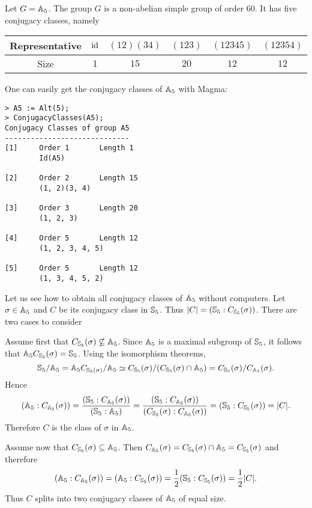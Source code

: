 Let $G=\mathbb{A}_5$. 
The group $G$ is a non-abelian simple group of order 60. It has five conjugacy classes, namely

\bigskip 
\begin{center}
    \begin{tabular}{c|ccccc}
         Representative & $\operatorname{id}$  & $(12)(34)$ & $(123)$  & $(12345)$ & $(12354)$\\
         \hline 
         Size & $1$ & $15$ & $20$ & $12$ & $12$ \\
    \end{tabular}
\end{center}
\bigskip 

One can easily get the conjugacy classes of 
$\mathbb{A}_5$ with Magma:
\begin{lstlisting}
> A5 := Alt(5);
> ConjugacyClasses(A5);
Conjugacy Classes of group A5
-----------------------------
[1]     Order 1       Length 1
        Id(A5)

[2]     Order 2       Length 15
        (1, 2)(3, 4)

[3]     Order 3       Length 20
        (1, 2, 3)

[4]     Order 5       Length 12
        (1, 2, 3, 4, 5)

[5]     Order 5       Length 12
        (1, 3, 4, 5, 2)    
\end{lstlisting}

Let us see how to obtain all conjugacy classes
of $\mathbb{A}_5$ without computers. Let $\sigma\in\mathbb{A}_5$ and $C$ be its
conjugacy class in $\mathbb{S}_5$. Thus $|C|=(\mathbb{S}_5:C_{\mathbb{S}_5}(\sigma))$. There are two cases to consider

Assume first that $C_{\mathbb{S}_5}(\sigma)\not\subseteq\mathbb{A}_5$. Since $\mathbb{A}_5$ is a maximal subgroup of $\mathbb{S}_5$, it follows that 
$\mathbb{A}_5C_{\mathbb{S}_5}(\sigma)=\mathbb{S}_5$. Using the isomorphism theorems, 
\[
\mathbb{S}_5/\mathbb{A}_5=\mathbb{A}_5C_{\mathbb{S}_5(\sigma)}/\mathbb{A}_5
\simeq C_{\mathbb{S}_5}(\sigma)/(C_{\mathbb{S}_5}(\sigma)\cap\mathbb{A}_5)
=C_{\mathbb{S}_5}(\sigma)/C_{\mathbb{A}_5}(\sigma).
\]
Hence 
\[
(\mathbb{A}_5:C_{\mathbb{A}_5}(\sigma))=\frac{(\mathbb{S}_5:C_{\mathbb{A}_5}(\sigma))}{(\mathbb{S}_5:\mathbb{A}_5)}
=\frac{(\mathbb{S}_5:C_{\mathbb{A}_5}(\sigma))}{(C_{\mathbb{S}_5}(\sigma):C_{\mathbb{A}_5}(\sigma))}
=(\mathbb{S}_5:C_{\mathbb{S}_5}(\sigma))=|C|.
\]
Therefore $C$ is the class of $\sigma$ in $\mathbb{A}_5$. 

Assume now that $C_{\mathbb{S}_5}(\sigma)\subseteq\mathbb{A}_5$. Then 
$C_{\mathbb{A}_5}(\sigma)=C_{\mathbb{S}_5}(\sigma)\cap\mathbb{A}_5=C_{\mathbb{S}_5}(\sigma)$
and therefore 
\[
(\mathbb{A}_5:C_{\mathbb{A}_5}(\sigma))=(\mathbb{A}_5:C_{\mathbb{S}_5}(\sigma))
=\frac12(\mathbb{S}_5:C_{\mathbb{S}_5}(\sigma))=\frac12|C|.
\]
Thus $C$ splits into two conjugacy classes of $\mathbb{A}_5$ of equal size. 

